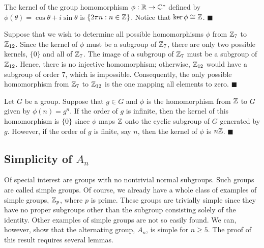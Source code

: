  
\medskip
 
 
The kernel of the group homomorphism $\phi : {\Bbb R} \rightarrow
{\Bbb C}^\ast$ defined by $\phi( \theta ) = \cos \theta + i \sin
\theta$ is $\{ 2 \pi n : n \in {\Bbb Z} \}$. Notice that $\ker \phi
\cong {\Bbb Z}$. 
\hspace{\fill} $\blacksquare$
 
 
\medskip
 
 
Suppose that we wish to determine all possible homomorphisms $\phi$
from ${\Bbb Z}_7$ to  ${\Bbb Z}_{12}$. Since the kernel of $\phi$ must
be a subgroup of  ${\Bbb Z}_7$, there are only two possible
kernels, $\{ 0 \}$ and all of ${\Bbb Z}_7$.  The image of a subgroup
of ${\Bbb Z}_7$ must be a subgroup of ${\Bbb Z}_{12}$. Hence, there is
no injective homomorphism; otherwise, ${\Bbb Z}_{12}$ would have a
subgroup of order 7, which is impossible. Consequently, the only
possible homomorphism from ${\Bbb Z}_7$ to  ${\Bbb Z}_{12}$ is the one
mapping all elements to zero. 
\hspace{\fill} $\blacksquare$
 
 
\vspace{ 2 ex}
 
 
Let $G$ be a group. Suppose that  $g \in G$ and $\phi$ is the
homomorphism from ${\Bbb Z}$ to $G$ given by $\phi( n ) = g^n$. If the
order of $g$ is infinite, then the kernel of this homomorphism is $\{
0 \}$ since $\phi$ maps ${\Bbb Z}$ onto the cyclic subgroup of $G$
generated by $g$. However, if the order of $g$ is finite, say $n$,
then the kernel of $\phi$ is $n {\Bbb Z}$.
\hspace{\fill} $\blacksquare$
 
 
\vspace{ 2 ex}
 
 
\subsection*{Simplicity of $A_n$}
 
 
Of special interest are groups with no nontrivial normal subgroups.
Such groups are called {\bfi simple
groups}.  Of course, we
already have a whole class of examples of simple groups, ${\Bbb Z}_p$,
where $p$ is prime.  These groups are trivially simple since they have
no proper subgroups other than the subgroup consisting solely of the
identity. Other examples of simple groups are not so easily found.
We can, however, show that the alternating group, $A_n$, is simple for
$n \geq 5$. The proof of this result requires several lemmas. 
 
